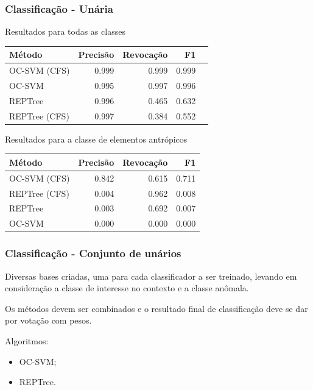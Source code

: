 \documentclass[t]{beamer}
\begin{document}
\begin{frame}[c]
	\frametitle{Classificação - Unária}

	\centering
	Resultados para todas as classes

	\small{
		\begin{table}[h]
		\centering
		\begin{tabulary}{\linewidth}{|L|R|R|R|R|}
		\hline
		\textbf{Método} & \textbf{Precisão} & \textbf{Revocação} & \textbf{F1} \\ \hline
		OC-SVM (CFS)  & 0.999 & 0.999 & 0.999 \\ \hline
		OC-SVM        & 0.995 & 0.997 & 0.996 \\ \hline
		REPTree       & 0.996 & 0.465 & 0.632 \\ \hline
		REPTree (CFS) & 0.997 & 0.384 & 0.552 \\ \hline
		\end{tabulary}
		\end{table}
	}

	\centering
	Resultados para a classe de elementos antrópicos

	\small{
		\begin{table}[h]
		\centering
		\begin{tabulary}{\linewidth}{|L|R|R|R|}
		\hline
		\textbf{Método} & \textbf{Precisão} & \textbf{Revocação} & \textbf{F1} \\ \hline
		OC-SVM (CFS)  & 0.842 & 0.615 & 0.711 \\ \hline
		REPTree (CFS) & 0.004 & 0.962 & 0.008 \\ \hline
		REPTree       & 0.003 & 0.692 & 0.007 \\ \hline
		OC-SVM        & 0.000 & 0.000 & 0.000 \\ \hline
		\end{tabulary}
		\end{table}
	}
\end{frame}

\begin{frame}[c]
	\frametitle{Classificação - Conjunto de unários}

	Diversas bases criadas, uma para cada classificador a ser treinado, levando em consideração a classe de interesse no contexto e a classe anômala.

	\vspace{0.5cm}

	Os métodos devem ser combinados e o resultado final de classificação deve se dar por votação com pesos.

	\vspace{0.5cm}

	Algoritmos:
	\begin{itemize}
		\item OC-SVM;
		\item REPTree.
	\end{itemize}
\end{frame}
\end{document}
